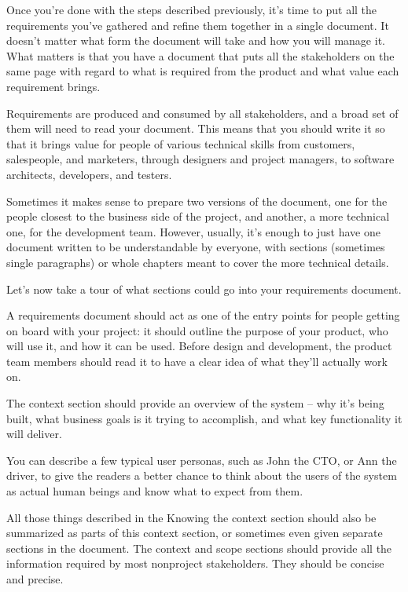 
Once you're done with the steps described previously, it's time to put all the requirements you've gathered and refine them together in a single document. It doesn't matter what form the document will take and how you will manage it. What matters is that you have a document that puts all the stakeholders on the same page with regard to what is required from the product and what value each requirement brings.

Requirements are produced and consumed by all stakeholders, and a broad set of them will need to read your document. This means that you should write it so that it brings value for people of various technical skills from customers, salespeople, and marketers, through designers and project managers, to software architects, developers, and testers.

Sometimes it makes sense to prepare two versions of the document, one for the people closest to the business side of the project, and another, a more technical one, for the development team. However, usually, it's enough to just have one document written to be understandable by everyone, with sections (sometimes single paragraphs) or whole chapters meant to cover the more technical details.

Let's now take a tour of what sections could go into your requirements document.


A requirements document should act as one of the entry points for people getting on board with your project: it should outline the purpose of your product, who will use it, and how it can be used. Before design and development, the product team members should read it to have a clear idea of what they'll actually work on.

The context section should provide an overview of the system – why it's being built, what business goals is it trying to accomplish, and what key functionality it will deliver. 

You can describe a few typical user personas, such as John the CTO, or Ann the driver, to give the readers a better chance to think about the users of the system as actual human beings and know what to expect from them.

All those things described in the Knowing the context section should also be summarized as parts of this context section, or sometimes even given separate sections in the document. The context and scope sections should provide all the information required by most nonproject stakeholders. They should be concise and precise.

